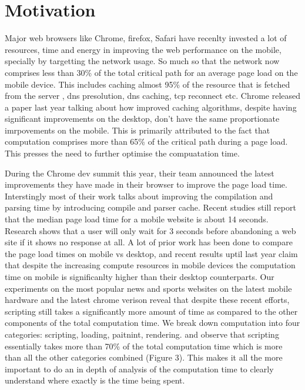 \section{Motivation}
\label{sec:motivation}


Major web browsers like Chrome, firefox, Safari have recenlty invested a lot of resources,
time and energy in improving the web performance on the mobile, specially by targetting 
the network usage. So much so that the network now comprises less than 30\% \cite{njait2016www} of the total critical
path for an average page load on the mobile device. This includes caching almost 95\% of the
resource that is fetched from the server \cite{vesuna2016caching}, dns presolution, dns caching, tcp reconnect etc.
Chrome released a paper last year talking about how improved caching algorithms, despite having 
significant improvements on the desktop, don't have the same proportionate imrpovements 
on the mobile. This is primarily attributed to the fact that computation comprises more than 65\%
of the critical path during a page load. This presses the need to further optimise the compuatation 
time. 

During the Chrome dev summit this year, their team announced the latest improvements they have 
made in their browser to improve the page load time. Interstingly most of their work talks about
improving the compilation and parsing time by introducing compile and parser cache. 
Recent studies \cite{url4} still report that the median page load time for a mobile website 
is about 14 seconds. Research \cite{url4} shows that a user will only wait for 3 seconds 
before abandoning a web site if it shows no response at all. A lot of prior work \cite {njait2016www}
has been done to compare the page load times on mobile vs desktop, and recent results
uptil last year claim that despite the increasing compute resources in mobile devices 
the computation time on mobile is significanlty higher than their desktop counterparts. 
 Our experiments
on the most popular news and sports websites on the latest mobile hardware and the latest 
chrome verison reveal that despite these recent efforts, scripting still takes a significantly more
amount of time as compared to the other components of the total computation time. We break down computation
into four categories: scripting, loading, paitnint, rendering.
and observe that scripting essentially takes more than 70\% of the total
computation time which is more than all the other categories combined (Figure 3). 
This makes it all the more important to do an in depth of analysis of the computation time to clearly
understand where exactly is the time being spent. 
